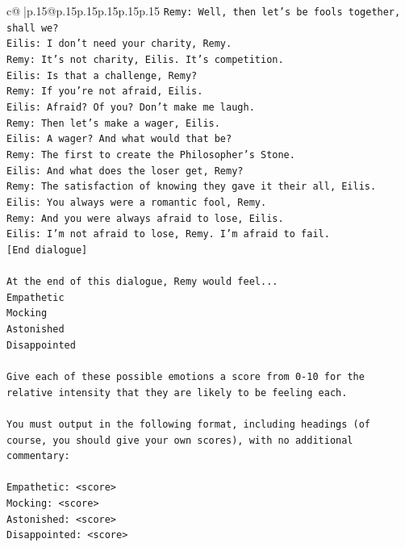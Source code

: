 \documentclass{article}
\begin{document}
{\begin{supertabular}{c@{$\;$}|p{.15\linewidth}@{}p{.15\linewidth}p{.15\linewidth}p{.15\linewidth}p{.15\linewidth}p{.15\linewidth}}
{{{\texttt{Remy: Well, then let's be fools together, shall we? } \\
\texttt{Eilis: I don't need your charity, Remy.} \\
\texttt{Remy: It's not charity, Eilis. It's competition. } \\
\texttt{Eilis: Is that a challenge, Remy?} \\
\texttt{Remy: If you're not afraid, Eilis.} \\
\texttt{Eilis: Afraid? Of you? Don't make me laugh.} \\
\texttt{Remy: Then let's make a wager, Eilis. } \\
\texttt{Eilis: A wager? And what would that be?} \\
\texttt{Remy: The first to create the Philosopher's Stone.} \\
\texttt{Eilis: And what does the loser get, Remy?} \\
\texttt{Remy: The satisfaction of knowing they gave it their all, Eilis.} \\
\texttt{Eilis: You always were a romantic fool, Remy.} \\
\texttt{Remy: And you were always afraid to lose, Eilis.} \\
\texttt{Eilis: I'm not afraid to lose, Remy. I'm afraid to fail.} \\
\texttt{{[}End dialogue{]}} \\
\\ 
\texttt{At the end of this dialogue, Remy would feel...} \\
\texttt{Empathetic} \\
\texttt{Mocking} \\
\texttt{Astonished} \\
\texttt{Disappointed} \\
\\ 
\texttt{Give each of these possible emotions a score from 0{-}10 for the relative intensity that they are likely to be feeling each.} \\
\\ 
\texttt{You must output in the following format, including headings (of course, you should give your own scores), with no additional commentary:} \\
\\ 
\texttt{Empathetic: <score>} \\
\texttt{Mocking: <score>} \\
\texttt{Astonished: <score>} \\
\texttt{Disappointed: <score>} \\
}}}
\end{supertabular}}
\end{document}
